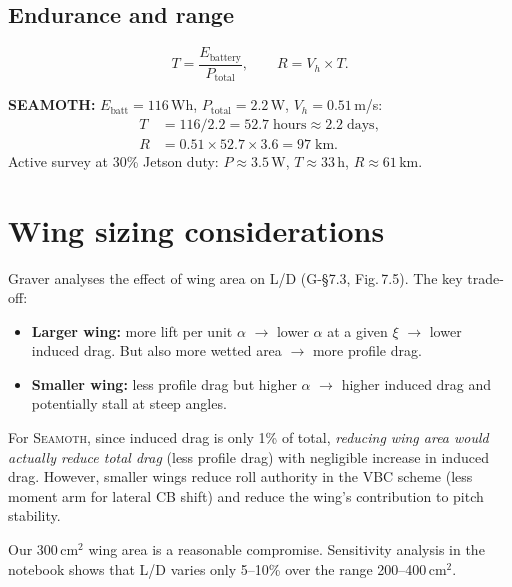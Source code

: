 \documentclass[11pt,a4paper]{article}
\newcommand{\seamoth}{\textsc{Seamoth}}
\newcommand{\note}[1]{\par\smallskip\noindent\colorbox{blue!8}{\parbox{\dimexpr\linewidth-2\fboxsep}{%
  \small\textbf{SEAMOTH:} #1}}\smallskip}
\begin{document}
\subsection{Endurance and range}

\begin{equation}
  T = \frac{E_\text{battery}}{P_\text{total}}, \qquad
  R = V_h\times T.
  \label{eq:endurance}
\end{equation}

\note{$E_\text{batt}=116$\,Wh, $P_\text{total}=2.2$\,W, $V_h=0.51$\,m/s:
\begin{align*}
  T &= 116/2.2 = 52.7\;\text{hours} \approx 2.2\;\text{days}, \\
  R &= 0.51\times52.7\times3.6 = 97\;\text{km}.
\end{align*}
Active survey at 30\% Jetson duty: $P\approx3.5$\,W, $T\approx33$\,h, $R\approx61$\,km.}


\section{Wing sizing considerations}
\label{sec:wingsizing}

Graver analyses the effect of wing area on L/D (G-\S7.3, Fig.\,7.5).  The key
trade-off:

\begin{itemize}[nosep]
  \item \textbf{Larger wing:} more lift per unit $\alpha$ $\rightarrow$ lower $\alpha$
    at a given $\xi$ $\rightarrow$ lower induced drag.  But also more wetted area
    $\rightarrow$ more profile drag.
  \item \textbf{Smaller wing:} less profile drag but higher $\alpha$ $\rightarrow$
    higher induced drag and potentially stall at steep angles.
\end{itemize}

For \seamoth{}, since induced drag is only 1\% of total, \emph{reducing wing area
would actually reduce total drag} (less profile drag) with negligible increase in
induced drag.  However, smaller wings reduce roll authority in the VBC scheme
(less moment arm for lateral CB shift) and reduce the wing's contribution to pitch
stability.

Our 300\,cm$^2$ wing area is a reasonable compromise.  Sensitivity analysis in the
notebook shows that L/D varies only 5--10\% over the range 200--400\,cm$^2$.
\end{document}
